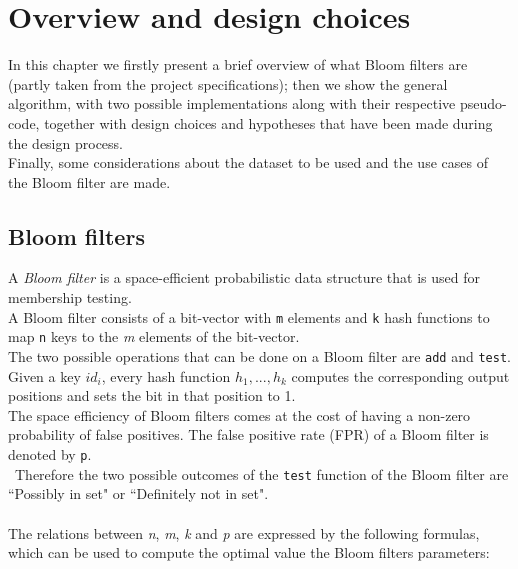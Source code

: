 %       
%
\chapter{Overview and design choices}\label{ch:design}
In this chapter we firstly present a brief overview of what Bloom filters are (partly taken from the project specifications); then we show the general algorithm, with two possible implementations along with their respective pseudo-code, together with design choices and hypotheses that have been made during the design process.\\
Finally, some considerations about the dataset to be used and the use cases of the Bloom filter are made.\\

\section{Bloom filters}
A \textit{Bloom filter} is a space-efficient probabilistic data structure that is used for membership testing.\\
A Bloom filter consists of a bit-vector with \colorbox{gray!30}{\large \texttt{m}} elements and \colorbox{gray!30}{\large \texttt{k}} hash functions to map \colorbox{gray!30}{\large \texttt{n}} keys to the \textit{m} elements of the bit-vector.\\
The two possible operations that can be done on a Bloom filter are \texttt{add} and \texttt{test}.\\
Given a key \textit{$id_{i}$}, every hash function \textit{$h_{1}, ..., h_{k}$} computes the corresponding output positions and sets the bit in that position to 1.\\
The space efficiency of Bloom filters comes at the cost of having a non-zero probability of false positives. The false positive rate (FPR) of a Bloom filter is denoted by \colorbox{gray!30}{\large \texttt{p}}.\\\
Therefore the two possible outcomes of the \texttt{test} function of the Bloom filter are ``Possibly in set" or ``Definitely not in set".\\
\\
\noindent The relations between \textit{n}, \textit{m}, \textit{k} and \textit{p} are expressed by the following formulas, which can be used to compute the optimal value the Bloom filters parameters:

